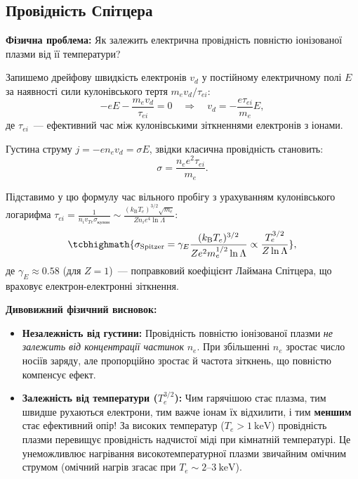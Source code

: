 \subsection{Провідність Спітцера}

\textbf{Фізична проблема:} Як залежить електрична провідність повністю іонізованої плазми від її температури?

Запишемо дрейфову швидкість електронів $v_d$ у постійному електричному полі $E$ за наявності сили кулонівського тертя $m_e v_d / \tau_{ei}$:
\begin{equation}
	-e E - \frac{m_e v_d}{\tau_{ei}} = 0 \quad \Rightarrow \quad v_d = -\frac{e \tau_{ei}}{m_e} E,
\end{equation}
де $\tau_{ei}$~--- ефективний час між кулонівськими зіткненнями електронів з іонами.

Густина струму $j = -e n_e v_d = \sigma E$, звідки класична провідність становить:
\begin{equation}
	\sigma = \frac{n_e e^2 \tau_{ei}}{m_e}.
\end{equation}

Підставимо у цю формулу час вільного пробігу з урахуванням кулонівського логарифма $\tau_{ei} = \frac{1}{n_i v_{Te} \sigma_{\text{кулон}}} \sim \frac{(k_{\mathrm B}T_e)^{3/2} \sqrt{m_e}}{Z n_i e^4 \ln\Lambda}$:
\begin{equation}
	\tcbhighmath{\sigma_{\text{Spitzer}} = \gamma_E \frac{(k_{\mathrm B}T_e)^{3/2}}{Z e^2 m_e^{1/2} \ln\Lambda} \propto \frac{T_e^{3/2}}{Z \ln\Lambda}},
\end{equation}
де $\gamma_E \approx 0.58$ (для $Z=1$)~--- поправковий коефіцієнт Лаймана Спітцера, що враховує електрон-електронні зіткнення.

\textbf{Дивовижний фізичний висновок:}
\begin{itemize}
	\item \textbf{Незалежність від густини:} Провідність повністю іонізованої плазми \emph{не залежить від концентрації частинок} $n_e$. При збільшенні $n_e$ зростає число носіїв заряду, але пропорційно зростає й частота зіткнень, що повністю компенсує ефект.
	\item \textbf{Залежність від температури ($T_e^{3/2}$):} Чим гарячішою стає плазма, тим швидше рухаються електрони, тим важче іонам їх відхилити, і тим \textbf{меншим} стає ефективний опір!
	За високих температур ($T_e > 1~\mathrm{keV}$) провідність плазми перевищує провідність надчистої міді при кімнатній температурі. Це унеможливлює нагрівання високотемпературної плазми звичайним омічним струмом (омічний нагрів згасає при $T_e \sim 2\text{--}3~\mathrm{keV}$).
\end{itemize}


